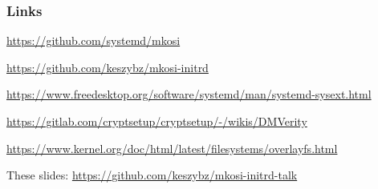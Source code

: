 \documentclass[]{beamer}
\begin{document}
\begin{frame}[fragile]
  \frametitle{Links}

  \url{https://github.com/systemd/mkosi}

  \url{https://github.com/keszybz/mkosi-initrd}

  \url{https://www.freedesktop.org/software/systemd/man/systemd-sysext.html}

  {
    \small
    \url{https://gitlab.com/cryptsetup/cryptsetup/-/wikis/DMVerity}\\
    }

  \url{https://www.kernel.org/doc/html/latest/filesystems/overlayfs.html}

  These slides: \url{https://github.com/keszybz/mkosi-initrd-talk}

\end{frame}
\end{document}

